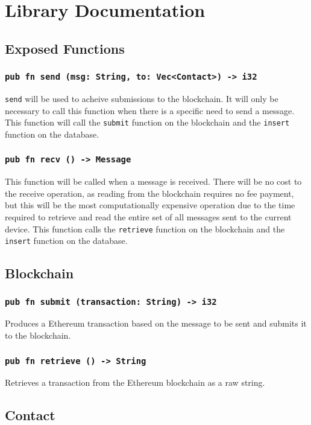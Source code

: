 \documentclass[]{article}
\begin{document}
\section{Library Documentation}

\subsection{Exposed Functions}
\subsubsection{\texttt{pub fn send (msg: String, to: Vec<Contact>) -> i32}}
\texttt{send} will be used to acheive submissions to the blockchain. It will only be necessary to call this function when there is a specific need to send a message. This function will call the \texttt{submit} function on the blockchain and the \texttt{insert} function on the database.
\subsubsection{\texttt{pub fn recv () -> Message}}
This function will be called when a message is received. There will be no cost to the receive operation, as reading from the blockchain requires no fee payment, but this will be the most computationally expensive operation due to the time required to retrieve and read the entire set of all messages sent to the current device. This function calls the \texttt{retrieve} function on the blockchain and the \texttt{insert} function on the database.

\subsection{Blockchain}
\subsubsection{\texttt{pub fn submit (transaction: String) -> i32}}
Produces a Ethereum transaction based on the message to be sent and submits it to the blockchain.
\subsubsection{\texttt{pub fn retrieve () -> String}}
Retrieves a transaction from the Ethereum blockchain as a raw string.

\subsection{Contact}
\end{document}
